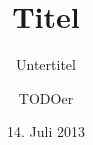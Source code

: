 \documentclass[fontsize=12, BCOR=0mm, titlepage=true, DIV=12, pagesize=auto, headings=small, a4paper]{scrartcl}
\date{}
\begin{document}

\singlespacing
\titlehead{{\Large Institut~kurz
\hfill SoSe~2013\\}
Institut~lang\\
Musterstr.~6\\
99999 Mustertown}
\subject{Thema}
\title{Titel}
\subtitle{Untertitel}
\author{TODOer}
\date{14. Juli 2013}
\publishers{Betreut durch}

\maketitle

\tableofcontents
\onehalfspacing
\clearpage


\clearpage

\singlespacing

\printbibliography
\clearpage

\listoffigures
\clearpage


\end{document}
